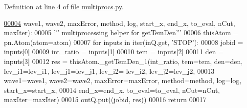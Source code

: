 Definition at line \hyperlink{multiprocs_8py_source_l00004}{4} of file \hyperlink{multiprocs_8py_source}{multiprocs.\+py}.


\begin{DoxyCode}
\hypertarget{namespacepyneb_1_1utils_1_1multiprocs_l00004}{}\hyperlink{namespacepyneb_1_1utils_1_1multiprocs_a714d57392053c47df242a942eb959b69}{00004}          wave1, wave2, maxError, method, log, start\_x, end\_x, to\_eval, nCut, maxIter):
00005     \textcolor{stringliteral}{''' multiprocessing helper for getTemDen'''}
00006     thisAtom = pn.Atom(atom=atom)
00007     \textcolor{keywordflow}{for} inputs \textcolor{keywordflow}{in} iter(inQ.get, \textcolor{stringliteral}{'STOP'}):
00008         jobid = inputs[0]
00009         int\_ratio = inputs[1]
00010         tem = inputs[2]
00011         den = inputs[3]
00012         res = thisAtom.\_getTemDen\_1(int\_ratio, tem=tem, den=den, lev\_i1=lev\_i1, lev\_j1=lev\_j1, lev\_i2=
      lev\_i2, lev\_j2=lev\_j2,
00013                   wave1=wave1, wave2=wave2, maxError=maxError, method=method, log=log, start\_x=start\_x, 
00014                   end\_x=end\_x, to\_eval=to\_eval, nCut=nCut, maxIter=maxIter)
00015         outQ.put((jobid, res))
00016     \textcolor{keywordflow}{return}
00017 \end{DoxyCode}
